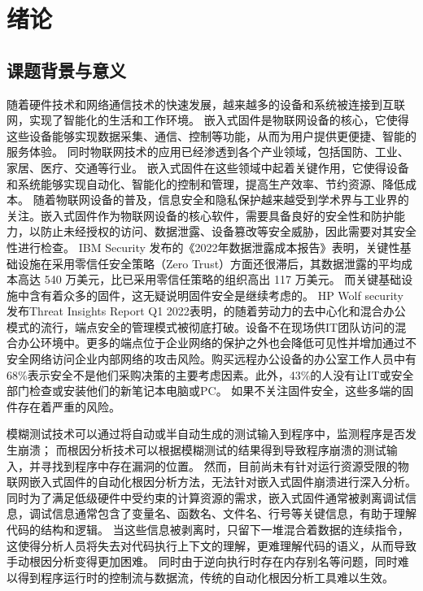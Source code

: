 \cleardoublepage

\section{绪论}
\subsection{课题背景与意义}
随着硬件技术和网络通信技术的快速发展，越来越多的设备和系统被连接到互联网，实现了智能化的生活和工作环境。
嵌入式固件是物联网设备的核心，它使得这些设备能够实现数据采集、通信、控制等功能，从而为用户提供更便捷、智能的服务体验。
同时物联网技术的应用已经渗透到各个产业领域，包括国防、工业、家居、医疗、交通等行业。
嵌入式固件在这些领域中起着关键作用，它使得设备和系统能够实现自动化、智能化的控制和管理，提高生产效率、节约资源、降低成本。
随着物联网设备的普及，信息安全和隐私保护越来越受到学术界与工业界的关注。嵌入式固件作为物联网设备的核心软件，需要具备良好的安全性和防护能力，以防止未经授权的访问、数据泄露、设备篡改等安全威胁，因此需要对其安全性进行检查。
IBM Security 发布的《2022年数据泄露成本报告》\cite{Cost}表明，关键性基础设施在采用零信任安全策略（Zero Trust）方面还很滞后，其数据泄露的平均成本高达 540 万美元，比已采用零信任策略的组织高出 117 万美元。
而关键基础设施中含有着众多的固件，这无疑说明固件安全是继续考虑的。
HP Wolf security 发布Threat Insights Report Q1 2022\cite{HP-Wolf}表明，的随着劳动力的去中心化和混合办公模式的流行，端点安全的管理模式被彻底打破。设备不在现场供IT团队访问的混合办公环境中。更多的端点位于企业网络的保护之外也会降低可见性并增加通过不安全网络访问企业内部网络的攻击风险。购买远程办公设备的办公室工作人员中有68\%表示安全不是他们采购决策的主要考虑因素。此外，43\%的人没有让IT或安全部门检查或安装他们的新笔记本电脑或PC。
如果不关注固件安全，这些多端的固件存在着严重的风险。

模糊测试技术可以通过将自动或半自动生成的测试输入到程序中，监测程序是否发生崩溃；
而根因分析技术可以根据模糊测试的结果得到导致程序崩溃的测试输入，并寻找到程序中存在漏洞的位置。
然而，目前尚未有针对运行资源受限的物联网嵌入式固件的自动化根因分析方法，无法针对嵌入式固件崩溃进行深入分析。
同时为了满足低级硬件中受约束的计算资源的需求，嵌入式固件通常被剥离调试信息，调试信息通常包含了变量名、函数名、文件名、行号等关键信息，有助于理解代码的结构和逻辑。
当这些信息被剥离时，只留下一堆混合着数据的连续指令，这使得分析人员将失去对代码执行上下文的理解，更难理解代码的语义，从而导致手动根因分析变得更加困难。
同时由于逆向执行时存在内存别名等问题，同时难以得到程序运行时的控制流与数据流，传统的自动化根因分析工具难以生效。

